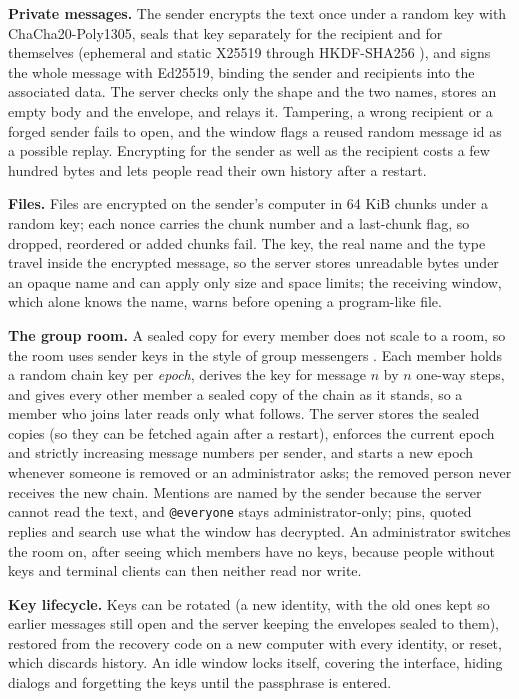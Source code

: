 \documentclass[conference]{IEEEtran}
\newcommand{\code}[1]{\texttt{#1}}
\begin{document}
\textbf{Private messages.} The sender encrypts the text once under a random key with ChaCha20-Poly1305, seals that key separately for the recipient and for themselves (ephemeral and static X25519 through HKDF-SHA256 \cite{rfc5869}), and signs the whole message with Ed25519, binding the sender and recipients into the associated data. The server checks only the shape and the two names, stores an empty body and the envelope, and relays it. Tampering, a wrong recipient or a forged sender fails to open, and the window flags a reused random message id as a possible replay. Encrypting for the sender as well as the recipient costs a few hundred bytes and lets people read their own history after a restart.

\textbf{Files.} Files are encrypted on the sender's computer in 64 KiB chunks under a random key; each nonce carries the chunk number and a last-chunk flag, so dropped, reordered or added chunks fail. The key, the real name and the type travel inside the encrypted message, so the server stores unreadable bytes under an opaque name and can apply only size and space limits; the receiving window, which alone knows the name, warns before opening a program-like file.

\textbf{The group room.} A sealed copy for every member does not scale to a room, so the room uses sender keys in the style of group messengers \cite{rfc9420}. Each member holds a random chain key per \emph{epoch}, derives the key for message $n$ by $n$ one-way steps, and gives every other member a sealed copy of the chain as it stands, so a member who joins later reads only what follows. The server stores the sealed copies (so they can be fetched again after a restart), enforces the current epoch and strictly increasing message numbers per sender, and starts a new epoch whenever someone is removed or an administrator asks; the removed person never receives the new chain. Mentions are named by the sender because the server cannot read the text, and \code{@everyone} stays administrator-only; pins, quoted replies and search use what the window has decrypted. An administrator switches the room on, after seeing which members have no keys, because people without keys and terminal clients can then neither read nor write.

\textbf{Key lifecycle.} Keys can be rotated (a new identity, with the old ones kept so earlier messages still open and the server keeping the envelopes sealed to them), restored from the recovery code on a new computer with every identity, or reset, which discards history. An idle window locks itself, covering the interface, hiding dialogs and forgetting the keys until the passphrase is entered.
\end{document}
